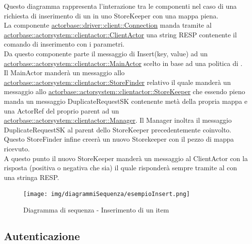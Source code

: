 \documentclass{scalatekids-article}
\begin{document}
Questo diagramma rappresenta l'interazione tra le componenti nel caso di una richiesta di inserimento di un  in uno StoreKeeper con una mappa piena.\\
La componente \hyperref[sec:actorbase::driver::client::Connection]{actorbase::driver::client::Connection}
manda tramite  al \hyperref[sec:actorbase::actorsystem::clientactor::ClientActor]{actorbase::actorsystem::clientactor::ClientActor}
una string RESP contenente il comando di inserimento  con
i parametri.\\ %
Da questo componente parte il messaggio di Insert(key, value) ad un \hyperref[sec:actorbase::actorsystem::clientactor::MainActor]{actorbase::actorsystem::clientactor::MainActor} scelto in base ad una
politica di . Il MainActor manderà un messaggio allo \hyperref[sec:actorbase::actorsystem::clientactor::StoreFinder]{actorbase::actorsystem::clientactor::StoreFinder} relativo il quale manderà un messaggio allo \hyperref[sec:actorbase::actorsystem::clientactor::StoreKeeper]{actorbase::actorsystem::clientactor::StoreKeeper} che essendo pieno manda un
messaggio DuplicateRequestSK contenente metà della propria mappa e una ActorRef del proprio parent ad un \hyperref[sec:actorbase::actorsystem::clientactor::Manager]{actorbase::actorsystem::clientactor::Manager}. Il Manager inoltra il messaggio DuplicateRequestSK al parent dello StoreKeeper precedentemente coinvolto. Questo StoreFinder infine creerà un nuovo Storekeeper con il pezzo di mappa ricevuto. \\
A questo punto il nuovo StoreKeeper manderà un messaggio al ClientActor con
la risposta (positiva o negativa che sia) il quale risponderà sempre tramite
 al  con una stringa RESP.
\begin{figure}[H]
  \begin{center}
    \texttt{[image: img/diagrammiSequenza/esempioInsert.png]}
    \caption{Diagramma di sequenza - Inserimento di un item}
  \end{center}
\end{figure}

\subsection{Autenticazione}
\end{document}
